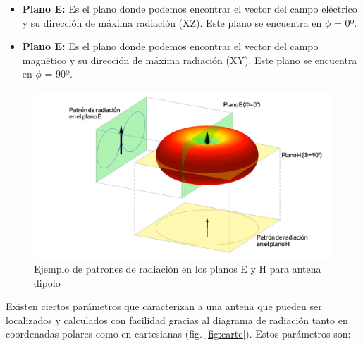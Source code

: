 \begin{itemize}
\item \textbf{Plano E: }Es el plano donde podemos encontrar el vector del campo eléctrico y su dirección de máxima radiación (XZ). Este plano se encuentra en $\phi $ = 0º. 

\item \textbf{Plano E: }Es el plano donde podemos encontrar el vector del campo magnético y su dirección de máxima radiación (XY). Este plano se encuentra en $\phi $ = 90º.
\end{itemize}

\begin{figure}[h]
    \centering
        \includegraphics[width=15cm]{archivos/radiacion/pattern}
        \caption{Ejemplo de patrones de radiación en los planos E y H para antena dipolo}
        \label{fig:pattern}
\end{figure}

\par Existen ciertos parámetros que caracterizan a una antena que pueden ser localizados y calculados con facilidad gracias al diagrama de radiación tanto en coordenadas polares como en cartesianas (fig. \ref{fig:carte}). Estos parámetros son:

